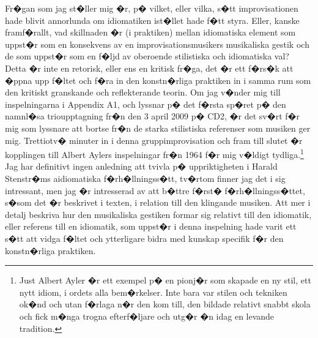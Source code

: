 \documentclass[a4paper]{article}
\begin{document}
Fr�gan som jag st�ller mig �r, p� vilket, eller vilka, s�tt improvisationen hade blivit annorlunda om idiomatiken ist�llet hade f�tt styra. Eller, kanske framf�rallt, vad skillnaden �r (i praktiken) mellan idiomatiska element som uppst�r som en konsekvens av en improvisationsmusikers musikaliska gestik och de som uppst�r som en f�ljd av oberoende stilistiska och idiomatiska val? Detta �r inte en retorisk, eller ens en kritisk fr�ga, det �r ett f�rs�k att �ppna upp f�ltet och f�ra in den konstn�rliga praktiken in i samma rum som den kritiskt granskande och reflekterande teorin. Om jag v�nder mig till inspelningarna i Appendix A1, och lyssnar p� det f�rsta sp�ret p� den namnl�sa trioupptagning fr�n den 3 april 2009 p� CD2, �r det sv�rt f�r mig som lyssnare att bortse fr�n de starka stilistiska referenser som musiken ger mig. Trettiotv� minuter in i denna gruppimprovisation och fram till slutet �r kopplingen till Albert Aylers inspelningar fr�n 1964 f�r mig v�ldigt tydliga.\footnote{Just Albert Ayler �r ett exempel p� en pionj�r som skapade en ny stil, ett nytt idiom, i ordets alla bem�rkelser. Inte bara var stilen och tekniken ok�nd och utan f�rlaga n�r den kom till, den bildade relativt snabbt skola och fick m�nga trogna efterf�ljare och utg�r �n idag en levande tradition.} Jag har definitivt ingen anledning att tvivla p� uppriktigheten i Harald Stenstr�ms aidiomatiska f�rh�llningss�tt, tv�rtom finner jag det i sig intressant, men jag �r intresserad av att b�ttre f�rst� f�rh�llningss�ttet, s�som det �r beskrivet i texten, i relation till den klingande musiken. Att mer i detalj beskriva hur den musikaliska gestiken formar sig relativt till den idiomatik, eller referens till en idiomatik, som uppst�r i denna inspelning hade varit ett s�tt att vidga f�ltet och ytterligare bidra med kunskap specifik f�r den konstn�rliga praktiken.
\end{document}
